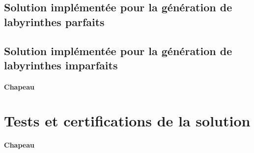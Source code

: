 \subsection{Solution implémentée pour la génération de labyrinthes parfaits}
\subsection{Solution implémentée pour la génération de labyrinthes imparfaits}
\paragraph{Chapeau}


\section{Tests et certifications de la solution} \label{sec:test2}

\paragraph{Chapeau}
